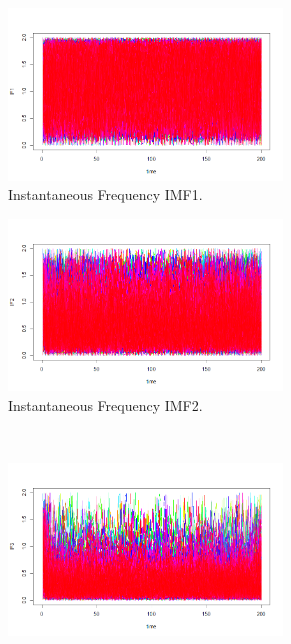 \documentclass[11pt, a4paper]{article} %
\begin{document}
\begin{landscape}
\begin{figure}
        \centering
        \begin{subfigure}[b]{0.475\hsize}\centering
            \centering
            \includegraphics[width=0.8\textwidth]{IF1_Ex2.png}
            \caption[Periodic Kernel]%
            {{\small Instantaneous Frequency IMF1.}} 
        \end{subfigure}
        \quad
        \begin{subfigure}[b]{0.475\hsize}\centering
            \centering 
            \includegraphics[width=0.8\textwidth]{IF2_Ex2.png}
            \caption[]%
            {{\small Instantaneous Frequency IMF2.}}    
        \end{subfigure}
        \\
        \begin{subfigure}[b]{0.475\hsize}\centering   
            \centering 
            \includegraphics[width=0.8\textwidth]{IF3_Ex2.png}

\end{subfigure}
\end{figure}
\end{landscape}
\end{document}
